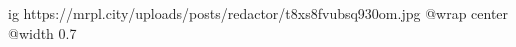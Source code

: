  
 
 
 
 

\ifcmt
  ig https://mrpl.city/uploads/posts/redactor/t8xs8fvubsq930om.jpg
  @wrap center
  @width 0.7
\fi
